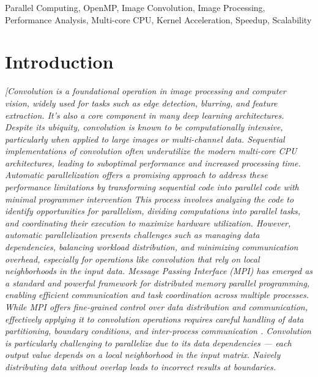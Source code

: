 \documentclass[conference, 10pt]{IEEEtran}
\begin{document}
\begin{IEEEkeywords}
Parallel Computing, OpenMP, Image Convolution, Image Processing, Performance Analysis, Multi-core CPU, Kernel Acceleration, Speedup, Scalability
\end{IEEEkeywords}


\section{Introduction}
\textit{{\color{blue} %
[Convolution is a foundational operation in image processing and computer vision, widely used for tasks such as edge detection, blurring, and feature extraction. It's also a core component in many deep learning architectures. 
Despite its ubiquity, convolution is known to be computationally intensive, particularly when applied to large images or multi-channel data. 
Sequential implementations of convolution often underutilize the modern multi-core CPU architectures, leading to suboptimal performance and increased processing time.
Automatic parallelization offers a promising approach to address these performance limitations by transforming sequential code into parallel code with minimal programmer intervention 
This process involves analyzing the code to identify opportunities for parallelism, dividing computations into parallel tasks, and coordinating their execution to maximize hardware utilization. 
However, automatic parallelization presents challenges such as managing data dependencies, balancing workload distribution, and minimizing communication overhead, especially for operations like convolution that rely on local neighborhoods in the input data.
Message Passing Interface (MPI) has emerged as a standard and powerful framework for distributed memory parallel programming, enabling efficient communication and task coordination across multiple processes. 
While MPI offers fine-grained control over data distribution and communication, effectively applying it to convolution operations requires careful handling of data partitioning, boundary conditions, and inter-process communication \cite{hager2021hpc}.
Convolution is particularly challenging to parallelize due to its data dependencies — each output value depends on a local neighborhood in the input matrix. 
Naively distributing data without overlap leads to incorrect results at boundaries. 
}}
\end{document}
